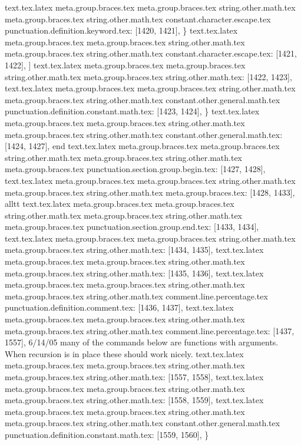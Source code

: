 {{{{{{{{{{{{{{{{{{{{{{{{{{{{{{{{{{{{text.tex.latex meta.group.braces.tex meta.group.braces.tex string.other.math.tex meta.group.braces.tex string.other.math.tex constant.character.escape.tex punctuation.definition.keyword.tex: [1420, 1421], {\}
text.tex.latex meta.group.braces.tex meta.group.braces.tex string.other.math.tex meta.group.braces.tex string.other.math.tex constant.character.escape.tex: [1421, 1422], {]}
text.tex.latex meta.group.braces.tex meta.group.braces.tex string.other.math.tex meta.group.braces.tex string.other.math.tex: [1422, 1423], {
}
text.tex.latex meta.group.braces.tex meta.group.braces.tex string.other.math.tex meta.group.braces.tex string.other.math.tex constant.other.general.math.tex punctuation.definition.constant.math.tex: [1423, 1424], {\}
text.tex.latex meta.group.braces.tex meta.group.braces.tex string.other.math.tex meta.group.braces.tex string.other.math.tex constant.other.general.math.tex: [1424, 1427], {end}
text.tex.latex meta.group.braces.tex meta.group.braces.tex string.other.math.tex meta.group.braces.tex string.other.math.tex meta.group.braces.tex punctuation.section.group.begin.tex: [1427, 1428], {{}
text.tex.latex meta.group.braces.tex meta.group.braces.tex string.other.math.tex meta.group.braces.tex string.other.math.tex meta.group.braces.tex: [1428, 1433], {alltt}
text.tex.latex meta.group.braces.tex meta.group.braces.tex string.other.math.tex meta.group.braces.tex string.other.math.tex meta.group.braces.tex punctuation.section.group.end.tex: [1433, 1434], {}}
text.tex.latex meta.group.braces.tex meta.group.braces.tex string.other.math.tex meta.group.braces.tex string.other.math.tex: [1434, 1435], {
}
text.tex.latex meta.group.braces.tex meta.group.braces.tex string.other.math.tex meta.group.braces.tex string.other.math.tex: [1435, 1436], {
}
text.tex.latex meta.group.braces.tex meta.group.braces.tex string.other.math.tex meta.group.braces.tex string.other.math.tex comment.line.percentage.tex punctuation.definition.comment.tex: [1436, 1437], {%
text.tex.latex meta.group.braces.tex meta.group.braces.tex string.other.math.tex meta.group.braces.tex string.other.math.tex comment.line.percentage.tex: [1437, 1557], { 6/14/05  many of the commands below are functions with arguments.  When recursion is in place these should work nicely.}
text.tex.latex meta.group.braces.tex meta.group.braces.tex string.other.math.tex meta.group.braces.tex string.other.math.tex: [1557, 1558], {
}
text.tex.latex meta.group.braces.tex meta.group.braces.tex string.other.math.tex meta.group.braces.tex string.other.math.tex: [1558, 1559], {
}
text.tex.latex meta.group.braces.tex meta.group.braces.tex string.other.math.tex meta.group.braces.tex string.other.math.tex constant.other.general.math.tex punctuation.definition.constant.math.tex: [1559, 1560], {\}
}}}}}}}}}}}}}}}}}}}}}}}}}}}}}}}}}}}}}}}}

